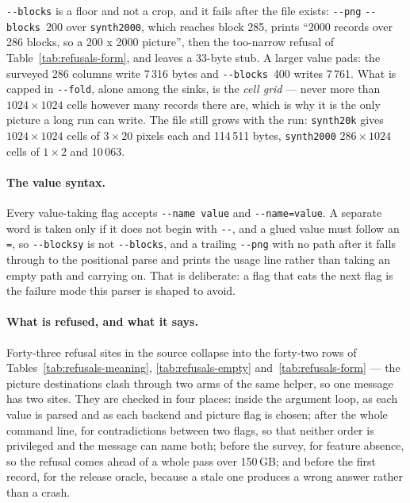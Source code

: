 \documentclass[11pt,a4paper]{article}
\newcommand{\flag}[1]{\texttt{-{}-#1}}
\begin{document}
\flag{blocks} is a floor and not a crop, and it fails after the file exists:
\flag{png} \flag{blocks}~200 over \texttt{synth2000}, which reaches block 285,
prints ``2000 records over 286 blocks, so a 200 x 2000 picture'', then the
too-narrow refusal of Table~\ref{tab:refusals-form}, and leaves a 33-byte stub.
A larger value pads: the surveyed 286 columns write 7\,316 bytes and
\flag{blocks}~400 writes 7\,761. What is capped in \flag{fold}, alone among
the sinks, is the \emph{cell grid} --- never more than $1024\times1024$ cells
however many records there are, which is why it is the only picture a long run
can write. The file still grows with the run: \texttt{synth20k} gives
$1024\times1024$ cells of $3\times20$ pixels each and 114\,511 bytes,
\texttt{synth2000} $286\times1024$ cells of $1\times2$ and 10\,063.

\paragraph{The value syntax.} Every value-taking flag accepts
\texttt{-{}-name value} and \texttt{-{}-name=value}. A separate word is taken
only if it does not begin with \texttt{-{}-}, and a glued value must follow an
\texttt{=}, so \texttt{-{}-blocksy} is not \flag{blocks}, and a trailing
\texttt{-{}-png} with no path after it falls through to the positional parse
and prints the usage line rather than taking an empty path and carrying on.
That is deliberate: a flag that eats the next flag is the failure mode this
parser is shaped to avoid.

\paragraph{What is refused, and what it says.} Forty-three refusal sites in the
source collapse into the forty-two rows of Tables~\ref{tab:refusals-meaning},
\ref{tab:refusals-empty} and~\ref{tab:refusals-form} --- the picture
destinations clash through two arms of the same helper, so one message has two
sites. They are checked in four places: inside the argument loop, as each value
is parsed and as each backend and picture flag is chosen; after the whole
command line, for contradictions between two flags, so that neither order is
privileged and the message can name both; before the survey, for feature
absence, so the refusal comes ahead of a whole pass over 150\,GB; and before the
first record, for the release oracle, because a stale one produces a wrong
answer rather than a crash.
\end{document}
